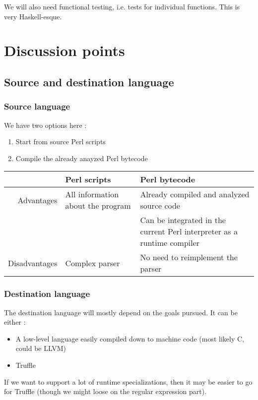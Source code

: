 \documentclass[11pt,a4paper]{report}
\newcommand{\pgl}[1]{\textsf{#1}}
\begin{document}
We will also need functional testing, i.e. tests for individual functions. This is very \pgl{Haskell}-esque.

\chapter{Discussion points}

\section{Source and destination language}

\subsection{Source language}

We have two options here :
\begin{enumerate}
\item Start from source Perl scripts
\item Compile the already anayzed Perl bytecode
\end{enumerate}

\begin{tabular}{|r|l|l|}
\hline
	& Perl scripts	& Perl bytecode \\
\hline
Advantages	& All information about the program	& Already compiled and analyzed source code \\
	&	& Can be integrated in the current Perl interpreter as a runtime compiler \\
\hline
Disadvantages	& Complex parser	& No need to reimplement the parser \\
\hline
\end{tabular}

\subsection{Destination language}

The destination language will mostly depend on the goals pursued. It can be either :
\begin{itemize}
\item A low-level language easily compiled down to machine code (most likely \pgl{C}, could be \pgl{LLVM})
\item Truffle
\end{itemize}

If we want to support a lot of runtime specializations, then it may be easier to go for Truffle (though we might loose on the regular expression part).
\end{document}
